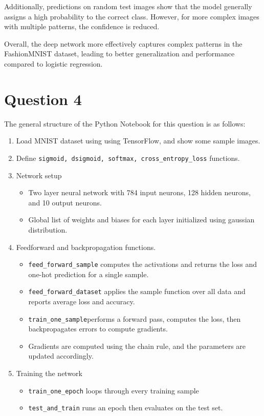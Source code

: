 \documentclass{article}
\begin{document}
Additionally, predictions on random test images show that the model generally assigns a high probability to the correct class. However, for more complex images with multiple patterns, the confidence is reduced.

Overall, the deep network more effectively captures complex patterns in the FashionMNIST dataset, leading to better generalization and performance compared to logistic regression.



\newpage
\section*{Question 4}
The general structure of the Python Notebook for this question is as follows:
\begin{enumerate}
    \item Load MNIST dataset using using TensorFlow, and show some sample images.
    \item Define \texttt{sigmoid, dsigmoid, softmax, cross\_entropy\_loss} functions.
    \item Network setup
    \begin{itemize}
        \item Two layer neural network with 784 input neurons, 128 hidden neurons, and 10 output neurons.
        \item Global list of weights and biases for each layer initialized using gaussian distribution.
    \end{itemize}
    \item Feedforward and backpropagation functions.
    \begin{itemize}
        \item \texttt{feed\_forward\_sample} computes the activations and returns the loss and one-hot prediction for a single sample.
        \item \texttt{feed\_forward\_dataset} applies the sample function over all data and reports average loss and accuracy.
        \item  \texttt{train\_one\_sample}performs a forward pass, computes the loss, then backpropagates errors to compute gradients.
        \item Gradients are computed using the chain rule, and the parameters are updated accordingly.
    \end{itemize}
    \item Training the network
        \begin{itemize}
        \item \texttt{train\_one\_epoch} loops through every training sample 
        \item \texttt{test\_and\_train} runs an epoch then evaluates on the test set.
    \end{itemize}
\end{enumerate}
\end{document}
